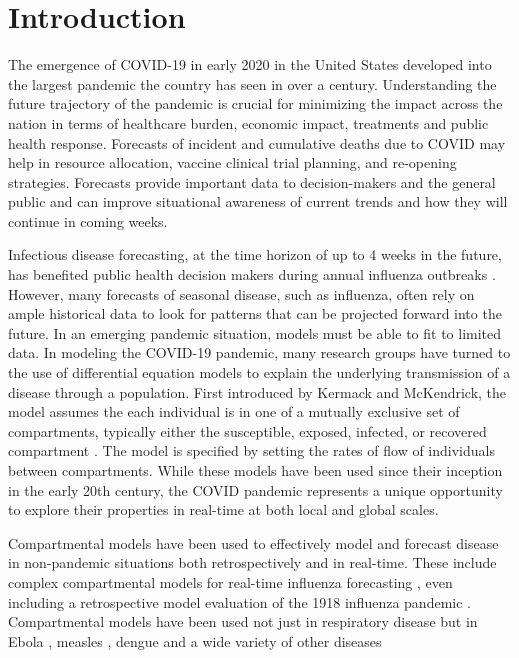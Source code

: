 \documentclass{umassthesis}          %
\begin{document}

\section{Introduction}

The emergence of COVID-19 in early 2020 in the United States developed into the largest pandemic the country has seen in over a century. Understanding the future trajectory of the pandemic is crucial for minimizing the impact across the nation in terms of healthcare burden, economic impact, treatments and public health response. Forecasts of incident and cumulative deaths due to COVID may help in resource allocation, vaccine clinical trial planning, and re-opening strategies. Forecasts provide important data to decision-makers and the general public and can improve situational awareness of current trends and how they will continue in coming weeks. 

Infectious disease forecasting, at the time horizon of up to 4 weeks in the future, has benefited public health decision makers during annual influenza outbreaks \cite{lutz2019applying}\cite{myers2000forecasting}.  However, many forecasts of seasonal disease, such as influenza, often rely on ample historical data to look for patterns that can be projected forward into the future. In an emerging pandemic situation, models must be able to fit to limited data. In modeling the COVID-19 pandemic, many research groups have turned to the use of differential equation models to explain the underlying transmission of a disease through a population. First introduced by  Kermack and McKendrick, the model assumes the each individual is in one of a mutually exclusive set of compartments, typically either the susceptible, exposed, infected, or recovered compartment \cite{kermack1927contribution}. The model is specified by setting the rates of flow of individuals between compartments. While these models have been used since their inception in the early 20th century, the COVID pandemic represents a unique opportunity to explore their properties in real-time at both local and global scales.
 
Compartmental models have been used to effectively model and forecast disease in non-pandemic situations both retrospectively and in real-time. These include complex compartmental models for real-time influenza forecasting \cite{shaman2012forecasting}\cite{osthus2017forecasting}\cite{ong2010real}, even including a retrospective model evaluation of the 1918 influenza pandemic \cite{hall2007real}. Compartmental models have been used not just in respiratory disease but in Ebola \cite{lekone2006statistical}, measles \cite{bokler1993chaos}, dengue \cite{syafruddin2012seir} and a wide variety of other diseases
\end{document}
